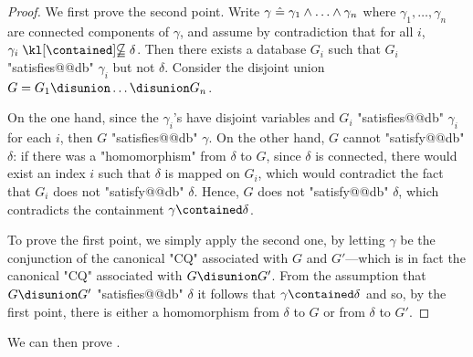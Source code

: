 \begin{proof}
	We first prove the second point.
    Write $\gamma \mathrel{\hat{=}} \gamma_1 \land \hdots \land \gamma_n$ where $\gamma_1,\hdots,\gamma_n$
    are connected components of $\gamma$, and assume by contradiction that
    for all $i$, $\gamma_i \notcontained \delta$. Then there exists a database $G_i$
    such that $G_i$ "satisfies@@db" $\gamma_i$ but not $\delta$.
    Consider the disjoint union $G = G_1 \disunion \hdots \disunion G_n$.

    On the one hand, since the $\gamma_i$'s have disjoint variables
    and $G_i$ "satisfies@@db" $\gamma_i$ for each $i$, then $G$ "satisfies@@db" $\gamma$.
    On the other hand, $G$ cannot "satisfy@@db" $\delta$:
    if there was a "homomorphism" from $\delta$ to $G$,
    since $\delta$ is connected, there would exist an index $i$
    such that $\delta$ is mapped on $G_i$, which would contradict the
    fact that $G_i$ does not "satisfy@@db" $\delta$.
    Hence, $G$ does not "satisfy@@db" $\delta$, which contradicts the containment
    $\gamma \contained \delta$.

	To prove the first point, we simply apply the second one, by letting $\gamma$
	be the conjunction of the canonical "CQ" associated with $G$ and $G'$---which
	is in fact the canonical "CQ" associated with $G\disunion G'$. From the assumption
    that $G \disunion G'$ "satisfies@@db" $\delta$ it follows that $\gamma \contained \delta$
    and so, by the first point, there is either a homomorphism from $\delta$
    to $G$ or from $\delta$ to $G'$.
\end{proof}

We can then prove .

